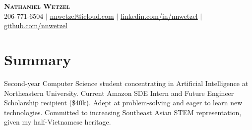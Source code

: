 \documentclass[letterpaper,11pt]{article}
\begin{document}

\begin{center}
    \textbf{\Huge \scshape Nathaniel Wetzel} \\ \vspace{1pt}
    \small 206-771-6504 $|$ \href{mailto:nnwetzel@icloud.com}{\underline{nnwetzel@icloud.com}} $|$ 
    \href{https://www.linkedin.com/in/nnwetzel/}{\underline{linkedin.com/in/nnwetzel}} $|$
    \href{https://github.com/nnwetzel}{\underline{github.com/nnwetzel}}
\end{center}

\section{Summary}
 \begin{itemize}[leftmargin=0.15in, label={}]
    \small{\item{
     \textbf{}Second-year Computer Science student concentrating in Artificial Intelligence at Northeastern University. Current Amazon SDE Intern and Future Engineer Scholarship recipient (\$40k). Adept at problem-solving and eager to learn new technologies. Committed to increasing Southeast Asian STEM representation, given my half-Vietnamese heritage.} \\
    }
 \end{itemize}

\end{document}
